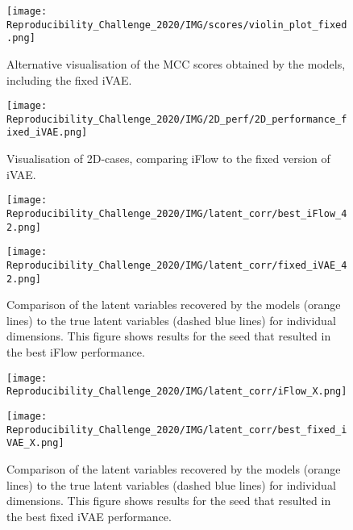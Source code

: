 \begin{figure}[ht]
    \centering
    \texttt{[image: Reproducibility\_Challenge\_2020/IMG/scores/violin\_plot\_fixed.png]} 
    \caption{Alternative visualisation of the MCC scores obtained by the models, including the fixed iVAE.} 
    \label{fig:violinplot} 
\end{figure}

\begin{figure}[ht]
    \centering
    \texttt{[image: Reproducibility\_Challenge\_2020/IMG/2D\_perf/2D\_performance\_fixed\_iVAE.png]} 
    \caption{Visualisation of 2D-cases, comparing iFlow to the fixed version of iVAE.} 
    \label{fig:fixedMCCscores} 
\end{figure}

\begin{figure}[!htbp]
    \centering
    \begin{minipage}[b]{\textwidth}
        \centering
       \texttt{[image: Reproducibility\_Challenge\_2020/IMG/latent\_corr/best\_iFlow\_42.png]}
    \end{minipage}
    \begin{minipage}[b]{\textwidth}
    \centering
       \texttt{[image: Reproducibility\_Challenge\_2020/IMG/latent\_corr/fixed\_iVAE\_42.png]}
    \end{minipage}
    \caption{Comparison of the latent variables recovered by the models (orange lines) to the true latent variables (dashed blue lines) for individual dimensions. This figure shows results for the seed that resulted in the best iFlow performance.}
    \label{fig:latentcorr_fixed1}
\end{figure}

\begin{figure}[!htbp]
    \centering
    \begin{minipage}[b]{\textwidth}
        \centering
       \texttt{[image: Reproducibility\_Challenge\_2020/IMG/latent\_corr/iFlow\_X.png]}
    \end{minipage}
    \begin{minipage}[b]{\textwidth}
    \centering
       \texttt{[image: Reproducibility\_Challenge\_2020/IMG/latent\_corr/best\_fixed\_iVAE\_X.png]}
    \end{minipage}
    \caption{Comparison of the latent variables recovered by the models (orange lines) to the true latent variables (dashed blue lines) for individual dimensions. This figure shows results for the seed that resulted in the best fixed iVAE performance.}
    \label{fig:latentcorr_fixed2}
\end{figure}

